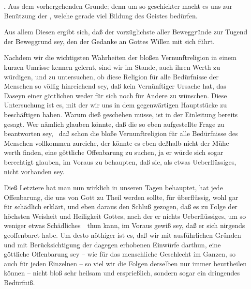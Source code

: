 \begin{aufza}
\item {}. Aus dem vorhergehenden Grunde; denn um so geschickter macht es uns zur Benützung der , welche gerade viel Bildung des Geistes bedürfen.
\begin{RWanm}
Aus allem Diesen ergibt sich, daß der vorzüglichste aller Beweggründe zur Tugend der Beweggrund sey, den der Gedanke an Gottes Willen mit sich führt.~
\end{RWanm}
\end{aufza}

Nachdem wir die wichtigsten Wahrheiten der bloßen Vernunftreligion in einem kurzen Umrisse kennen gelernt, sind wir im Stande, auch ihren Werth zu würdigen, und zu untersuchen, ob diese Religion für alle Bedürfnisse der Menschen so völlig hinreichend sey, daß kein Vernünftiger Ursache hat, das Daseyn einer göttlichen  weder für sich noch für Andere zu wünschen. Diese Untersuchung ist es, mit der wir uns in dem gegenwärtigen Hauptstücke zu beschäftigen haben. Warum dieß geschehen müsse, ist in der Einleitung bereits gesagt. Wer nämlich glauben könnte, daß die so eben aufgestellte Frage  zu beantworten sey, \dh\ daß schon die bloße Vernunftreligion für alle Bedürfnisse des Menschen vollkommen zureiche, der könnte es eben deßhalb nicht der Mühe werth finden, eine göttliche Offenbarung zu suchen, ja er würde sich sogar berechtigt glauben, im Voraus zu behaupten, daß sie, als etwas Ueberflüssiges, nicht vorhanden sey.\par
Dieß Letztere hat man nun wirklich in unseren Tagen behauptet, hat jede Offenbarung, die uns von Gott zu Theil werden sollte, für überflüssig, wohl gar für schädlich erklärt, und eben daraus den Schluß gezogen, daß es zu Folge der höchsten Weisheit und Heiligkeit Gottes, nach der er nichts Ueberflüssiges, um so weniger etwas Schädliches~\ thun kann, im Voraus gewiß sey, daß er sich nirgends geoffenbaret habe. Um desto nöthiger ist es, daß wir mit ausführlichen Gründen und mit Berücksichtigung der dagegen erhobenen Einwürfe darthun, eine göttliche Offenbarung sey -- wie für das menschliche Geschlecht im Ganzen, so auch für jeden Einzelnen -- so viel wir die Folgen derselben nur immer beurtheilen können -- nicht bloß sehr heilsam und ersprießlich, sondern sogar ein dringendes Bedürfniß.

